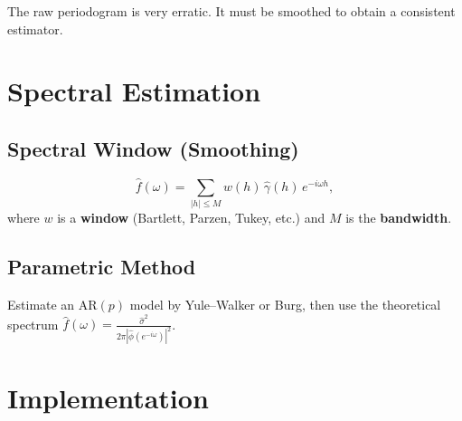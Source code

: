 \begin{warning}
The raw periodogram is very erratic. It must be smoothed to obtain a consistent estimator.
\end{warning}

\section{Spectral Estimation}

\subsection{Spectral Window (Smoothing)}

\begin{definition}
\[
\hat{f}(\omega) = \sum_{|h|\leq M} w(h)\,\hat{\gamma}(h)\,e^{-i\omega h},
\]
where $w$ is a \textbf{window} (Bartlett, Parzen, Tukey, etc.) and $M$ is the \textbf{bandwidth}.
\end{definition}

\subsection{Parametric Method}

Estimate an AR$(p)$ model by Yule--Walker or Burg, then use the theoretical spectrum $\hat{f}(\omega)=\frac{\hat\sigma^2}{2\pi|\hat\phi(e^{-i\omega})|^2}$.

\section{Implementation}


